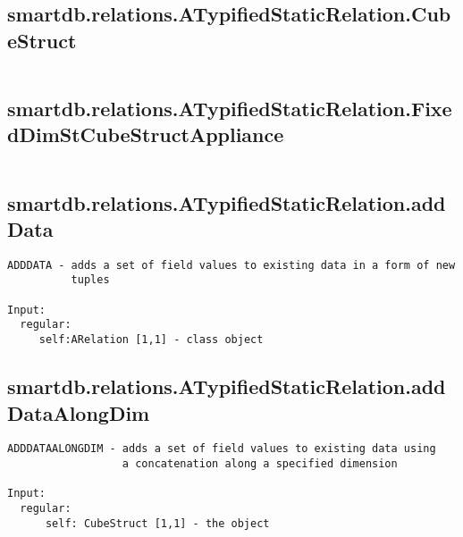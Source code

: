 \subsection{\texorpdfstring{smartdb.relations.ATypifiedStaticRelation.CubeStruct}{CubeStruct}}\label{method:smartdb.relations.ATypifiedStaticRelation.CubeStruct}
\begin{verbatim}

\end{verbatim}
\subsection{\texorpdfstring{smartdb.relations.ATypifiedStaticRelation.FixedDimStCubeStructAppliance}{FixedDimStCubeStructAppliance}}\label{method:smartdb.relations.ATypifiedStaticRelation.FixedDimStCubeStructAppliance}
\begin{verbatim}

\end{verbatim}
\subsection{\texorpdfstring{smartdb.relations.ATypifiedStaticRelation.addData}{addData}}\label{method:smartdb.relations.ATypifiedStaticRelation.addData}
\begin{verbatim}
ADDDATA - adds a set of field values to existing data in a form of new
          tuples

Input:
  regular:
     self:ARelation [1,1] - class object
\end{verbatim}
\subsection{\texorpdfstring{smartdb.relations.ATypifiedStaticRelation.addDataAlongDim}{addDataAlongDim}}\label{method:smartdb.relations.ATypifiedStaticRelation.addDataAlongDim}
\begin{verbatim}
ADDDATAALONGDIM - adds a set of field values to existing data using
                  a concatenation along a specified dimension

Input:
  regular:
      self: CubeStruct [1,1] - the object
\end{verbatim}
